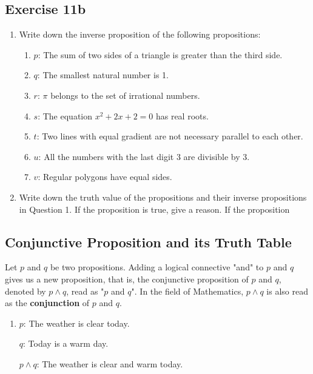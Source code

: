 \documentclass{report}
\begin{document}
\subsection*{Exercise 11b}
\begin{enumerate}[leftmargin=*]
    \item Write down the inverse proposition of the following propositions:
          \begin{enumerate}[label=, leftmargin=*]
              \item $p$: The sum of two sides of a triangle is greater than the third side.
              \item $q$: The smallest natural number is 1.
              \item $r$: $\pi$ belongs to the set of irrational numbers.
              \item $s$: The equation $x^2 + 2x + 2 = 0$ has real roots.
              \item $t$: Two lines with equal gradient are not necessary parallel to each other.
              \item $u$: All the numbers with the last digit 3 are divisible by 3.
              \item $v$: Regular polygons have equal sides.
          \end{enumerate}
    \item Write down the truth value of the propositions and their inverse propositions
          in Question 1. If the proposition is true, give a reason. If the proposition
\end{enumerate}

\subsection*{Conjunctive Proposition and its Truth Table}

Let $p$ and $q$ be two propositions. Adding a logical connective "and" to $p$
and $q$ gives us a new proposition, that is, the conjunctive proposition of $p$
and $q$, denoted by $p \land q$, read as "$p$ and $q$". In the field of
Mathematics, $p \land q$ is also read as the \textbf{conjunction} of $p$ and
$q$.

\begin{enumerate}[label=\indent For example, leftmargin=*]
    \item $p$: The weather is clear today.

          $q$: Today is a warm day.

          $p \land q$: The weather is clear and warm today.
\end{enumerate}
\end{document}
